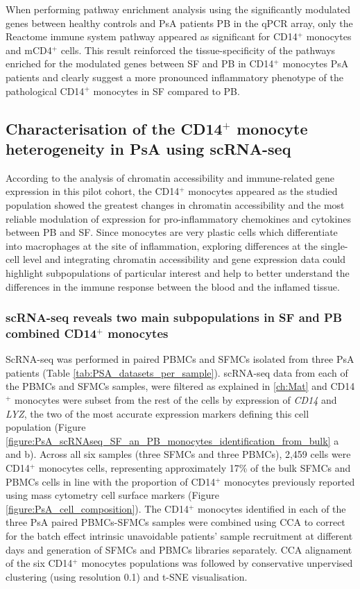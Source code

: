 When performing pathway enrichment analysis using the significantly modulated genes between healthy controls and PsA patients PB in the qPCR array, only the Reactome immune system pathway appeared as significant for CD14$^+$ monocytes and mCD4$^+$ cells. This result reinforced the tissue-specificity of the pathways enriched for the modulated genes between SF and PB in CD14$^+$ monocytes PsA patients and clearly suggest a more pronounced inflammatory phenotype of the pathological CD14$^+$ monocytes in SF compared to PB.



\subsection{Characterisation of the CD14$^+$ monocyte heterogeneity in PsA using scRNA-seq}
According to the analysis of chromatin accessibility and immune-related gene expression in this pilot cohort, the CD14$^+$ monocytes appeared as the studied population showed the greatest changes in chromatin accessibility and the most reliable modulation of expression for pro-inflammatory chemokines and cytokines between PB and SF. Since monocytes are very plastic cells which differentiate into macrophages at the site of inflammation, exploring differences at the single-cell level and integrating chromatin accessibility and gene expression data could highlight subpopulations of particular interest and help to better understand the differences in the immune response between the blood and the inflamed tissue.


\subsubsection{scRNA-seq reveals two main subpopulations in SF and PB combined CD14$^+$ monocytes}
ScRNA-seq was performed in paired PBMCs and SFMCs isolated from three PsA patients (Table \ref{tab:PSA_datasets_per_sample}). scRNA-seq data from each of the PBMCs and SFMCs samples, were filtered as explained in \ref{ch:Mat} and CD14$^+$ monocytes were subset from the rest of the cells by expression of \textit{CD14} and \textit{LYZ}, the two of the most accurate expression markers defining this cell population (Figure \ref{figure:PsA_scRNAseq_SF_an_PB_monocytes_identification_from_bulk} a and b). Across all six samples (three SFMCs and three PBMCs), 2,459 cells were CD14$^+$ monocytes cells, representing approximately 17\% of the bulk SFMCs and PBMCs cells in line with the proportion of CD14$^+$ monocytes previously reported using mass cytometry cell surface markers (Figure \ref{figure:PsA_cell_composition}). The CD14$^+$ monocytes identified in each of the three PsA paired PBMCs-SFMCs samples were combined using CCA to correct for the batch effect intrinsic unavoidable patients' sample recruitment at different days and generation of SFMCs and PBMCs libraries separately. CCA alignament of the six CD14$^+$ monocytes populations was followed by conservative unpervised clustering (using resolution 0.1) and t-SNE visualisation. 

